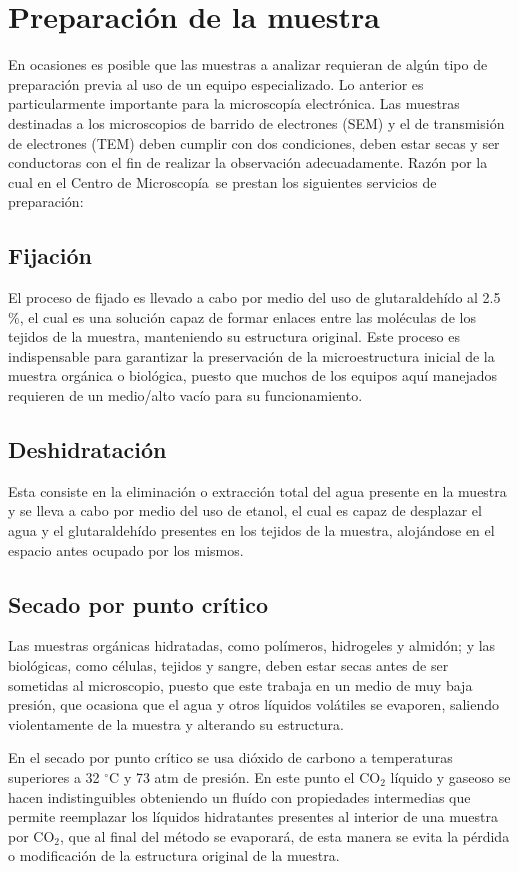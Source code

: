\documentclass[11pt, letter-size]{article}
\newcommand{\centro}{Centro de Microscop\'ia}
\begin{document}
	\section{Preparaci\'on de la muestra}
	En ocasiones es posible que las muestras a analizar requieran de alg\'un tipo de preparaci\'on previa al uso de un equipo especializado. Lo anterior es particularmente importante para la microscop\'ia electr\'onica. Las muestras destinadas a los microscopios de barrido de electrones (SEM) y el de transmisión de electrones (TEM) deben cumplir con dos condiciones, deben estar secas y ser conductoras con el fin de realizar la observación adecuadamente. Raz\'on por la cual en el \centro\ se prestan los siguientes servicios de preparaci\'on:
	
	\subsection{Fijaci\'on}
	El proceso de fijado es llevado a cabo por medio del uso de glutaraldehído al 2.5 \%, el cual es una solución capaz de formar enlaces entre las moléculas de los tejidos de la muestra, manteniendo su estructura original. Este proceso es indispensable para garantizar la preservación de la microestructura inicial de la muestra orgánica o biológica, puesto que muchos de los equipos aquí manejados requieren de un medio/alto vacío para su funcionamiento.
	
	\subsection{Deshidrataci\'on}
	Esta consiste en la eliminación o extracción total del agua presente en la muestra y se lleva a cabo por medio del uso de etanol, el cual es capaz de desplazar el agua y el glutaraldehído presentes en los tejidos de la muestra, alojándose en el espacio antes ocupado por los mismos.
	
	\subsection{Secado por punto cr\'itico}
	Las muestras orgánicas hidratadas, como polímeros, hidrogeles y almidón; y las biológicas, como células, tejidos y sangre, deben estar secas antes de ser sometidas al microscopio, puesto que este trabaja en un medio de muy baja presión, que ocasiona que el agua y otros líquidos volátiles se evaporen, saliendo violentamente de la muestra y alterando su estructura.
	
	En el secado por punto cr\'itico se usa di\'oxido de carbono a temperaturas superiores a 32 $^\circ$C y 73 atm de presi\'on. En este punto el CO$_2$ l\'iquido y gaseoso se hacen indistinguibles obteniendo un flu\'ido con propiedades intermedias que permite reemplazar los l\'iquidos hidratantes presentes al interior de una muestra por CO$_2$, que al final del m\'etodo se evaporar\'a, de esta manera se evita la pérdida o modificación de la estructura original de la muestra.
	
\end{document}

